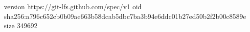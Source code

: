 version https://git-lfs.github.com/spec/v1
oid sha256:a796c652cb0b09ae663b58dcab5dbc7ba3b94e6ddc01b27ed50b2f2b00c8589e
size 349692
